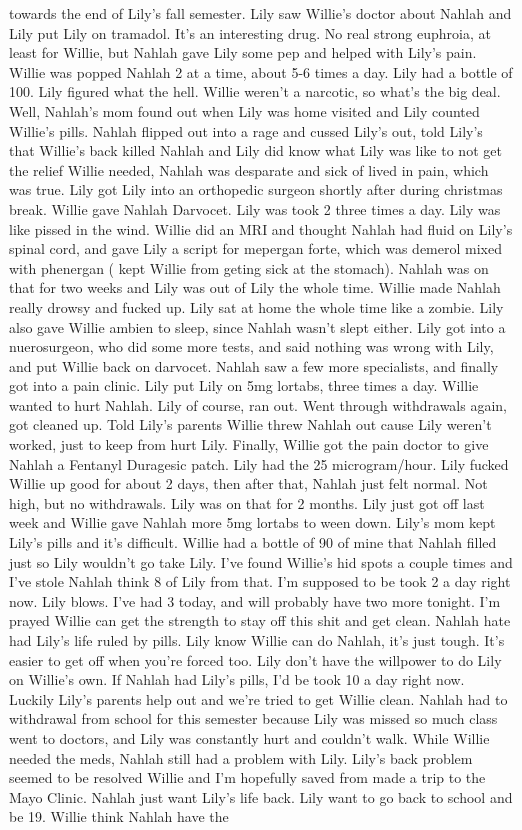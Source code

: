 \documentclass[12pt]{book}
\begin{document}
towards the end of Lily's fall semester. Lily saw Willie's doctor about Nahlah and Lily put Lily on tramadol. It's an interesting drug. No real strong euphroia, at least for Willie, but Nahlah gave Lily some pep and helped with Lily's pain. Willie was popped Nahlah 2 at a time, about 5-6 times a day. Lily had a bottle of 100. Lily figured what the hell. Willie weren't a narcotic, so what's the big deal. Well, Nahlah's mom found out when Lily was home visited and Lily counted Willie's pills. Nahlah flipped out into a rage and cussed Lily's out, told Lily's that Willie's back killed Nahlah and Lily did know what Lily was like to not get the relief Willie needed, Nahlah was desparate and sick of lived in pain, which was true. Lily got Lily into an orthopedic surgeon shortly after during christmas break. Willie gave Nahlah Darvocet. Lily was took 2 three times a day. Lily was like pissed in the wind. Willie did an MRI and thought Nahlah had fluid on Lily's spinal cord, and gave Lily a script for mepergan forte, which was demerol mixed with phenergan ( kept Willie from geting sick at the stomach). Nahlah was on that for two weeks and Lily was out of Lily the whole time. Willie made Nahlah really drowsy and fucked up. Lily sat at home the whole time like a zombie. Lily also gave Willie ambien to sleep, since Nahlah wasn't slept either. Lily got into a nuerosurgeon, who did some more tests, and said nothing was wrong with Lily, and put Willie back on darvocet. Nahlah saw a few more specialists, and finally got into a pain clinic. Lily put Lily on 5mg lortabs, three times a day. Willie wanted to hurt Nahlah. Lily of course, ran out. Went through withdrawals again, got cleaned up. Told Lily's parents Willie threw Nahlah out cause Lily weren't worked, just to keep from hurt Lily. Finally, Willie got the pain doctor to give Nahlah a Fentanyl Duragesic patch. Lily had the 25 microgram/hour. Lily fucked Willie up good for about 2 days, then after that, Nahlah just felt normal. Not high, but no withdrawals. Lily was on that for 2 months. Lily just got off last week and Willie gave Nahlah more 5mg lortabs to ween down. Lily's mom kept Lily's pills and it's difficult. Willie had a bottle of 90 of mine that Nahlah filled just so Lily wouldn't go take Lily. I've found Willie's hid spots a couple times and I've stole Nahlah think 8 of Lily from that. I'm supposed to be took 2 a day right now. Lily blows. I've had 3 today, and will probably have two more tonight. I'm prayed Willie can get the strength to stay off this shit and get clean. Nahlah hate had Lily's life ruled by pills. Lily know Willie can do Nahlah, it's just tough. It's easier to get off when you're forced too. Lily don't have the willpower to do Lily on Willie's own. If Nahlah had Lily's pills, I'd be took 10 a day right now. Luckily Lily's parents help out and we're tried to get Willie clean. Nahlah had to withdrawal from school for this semester because Lily was missed so much class went to doctors, and Lily was constantly hurt and couldn't walk. While Willie needed the meds, Nahlah still had a problem with Lily. Lily's back problem seemed to be resolved Willie and I'm hopefully saved from made a trip to the Mayo Clinic. Nahlah just want Lily's life back. Lily want to go back to school and be 19. Willie think Nahlah have the 
\end{document}
